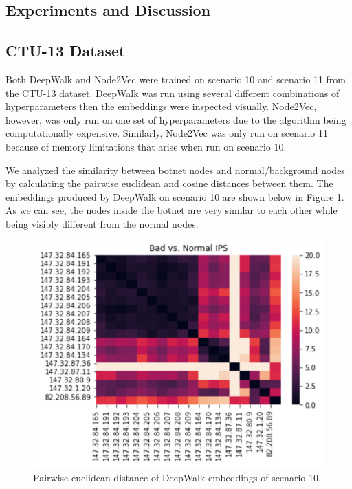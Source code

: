 \documentclass[10pt]{article}
\begin{document}
\begin{multicols}{2}
\section{Experiments and Discussion}
\subsection{CTU-13 Dataset}

Both DeepWalk and Node2Vec were trained on scenario 10 and scenario 11 from the CTU-13 dataset. DeepWalk was run using several different combinations of hyperparameters then the embeddings were inspected visually. Node2Vec, however, was only run on one set of hyperparameters due to the algorithm being computationally expensive. Similarly, Node2Vec was only run on scenario 11 because of memory limitations  that arise when run on scenario 10.

We analyzed the similarity between botnet nodes and normal/background nodes by calculating the pairwise euclidean and cosine distances between them. The embeddings produced by DeepWalk on scenario 10  are shown below in Figure 1. As we can see, the nodes inside the botnet are very similar to each other while being visibly different from the normal nodes. 

\begin{figure}[H]
	\includegraphics[scale=0.8]{1a.png}
	\caption{Pairwise euclidean distance of DeepWalk embeddings of scenario 10.}
\end{figure}


\end{multicols}
\end{document}
